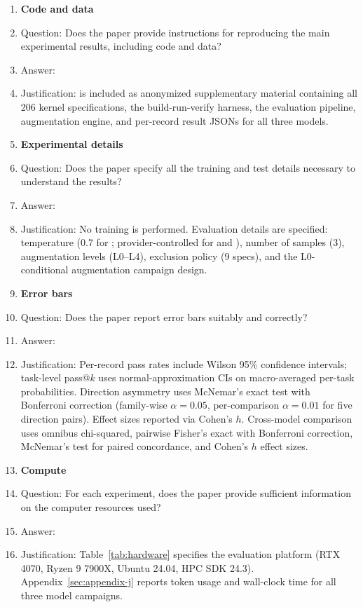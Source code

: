 {\begin{enumerate}
\item {\bf Code and data}
    \item[] Question: Does the paper provide instructions for reproducing the main experimental results, including code and data?
    \item[] Answer: \answerYes{}
    \item[] Justification: \parbench{} is included as anonymized supplementary material containing all 206 kernel specifications, the build-run-verify harness, the evaluation pipeline, augmentation engine, and per-record result JSONs for all three models.

\item {\bf Experimental details}
    \item[] Question: Does the paper specify all the training and test details necessary to understand the results?
    \item[] Answer: \answerYes{}
    \item[] Justification: No training is performed. Evaluation details are specified: temperature (0.7 for \qwenshort{}; provider-controlled for \gptnew{} and \codex{}), number of samples (3), augmentation levels (L0--L4), \knownfail{} exclusion policy (9 specs), and the L0-conditional augmentation campaign design.

\item {\bf Error bars}
    \item[] Question: Does the paper report error bars suitably and correctly?
    \item[] Answer: \answerYes{}
    \item[] Justification: Per-record pass rates include Wilson 95\% confidence intervals; task-level pass@$k$ uses normal-approximation CIs on macro-averaged per-task probabilities. Direction asymmetry uses McNemar's exact test with Bonferroni correction (family-wise $\alpha=0.05$, per-comparison $\alpha=0.01$ for five direction pairs). Effect sizes reported via Cohen's $h$. Cross-model comparison uses omnibus chi-squared, pairwise Fisher's exact with Bonferroni correction, McNemar's test for paired concordance, and Cohen's $h$ effect sizes.

\item {\bf Compute}
    \item[] Question: For each experiment, does the paper provide sufficient information on the computer resources used?
    \item[] Answer: \answerYes{}
    \item[] Justification: Table~\ref{tab:hardware} specifies the evaluation platform (RTX 4070, Ryzen 9 7900X, Ubuntu 24.04, HPC SDK 24.3). Appendix~\ref{sec:appendix-j} reports token usage and wall-clock time for all three model campaigns.


\end{enumerate}}
